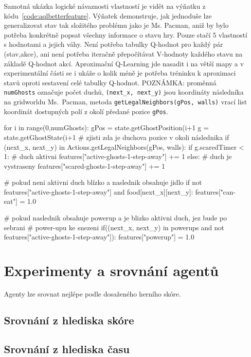 Samotná ukázka logické návaznosti vlastností je vidět na výňatku z kódu~\ref{code:aqlbetterfeature}. Výňatek demonstruje, jak jednoduše lze generalizovat stav tak složitého problému jako je Ms. Pacman, aniž by bylo potřeba konkrétně popsat všechny informace o stavu hry. Pouze stačí 5 vlastností s hodnotami a jejich váhy. Není potřeba tabulky Q-hodnot pro každý pár (stav,akce), ani není potřeba iteračně přepočítávat V-hodnoty každého stavu na základě Q-hodnot akcí. Aproximační Q-Learning jde nasadit i na větší mapy a v experimentální části se i ukáže o kolik méně je potřeba tréninku k aproximaci stavů oproti sestavení celé tabulky Q-hodnot. \newline POZNÁMKA: proměnná \texttt{numGhosts} označuje počet duchů, \texttt{(next\_x, next\_y)} jsou koordináty následníka na gridworldu Ms.~Pacman, metoda \texttt{getLegalNeighbors(gPos, walls)} vrací list koordinát dostupných polí z okolí předané pozice \texttt{gPos}.
\begin{python}[label={code:aqlbetterfeature}]
for i in range(0,numGhosts):
   gPos = state.getGhostPosition(i+1%
   g = state.getGhostState(i+1%
   # zjisti zda je duchova pozice v okoli následnika
   if (next_x, next_y) in Actions.getLegalNeighbors(gPos, walls):
      if g.scaredTimer < 1:   # duch aktivni
         features["active-ghosts-1-step-away"] += 1
      else:                   # duch je vystraseny
         features["scared-ghosts-1-step-away"] += 1

# pokud neni aktivni duch blízko a naslednik obsahuje jidlo
if not features["active-ghosts-1-step-away"] and food[next_x][next_y]:
   features["can-eat"] = 1.0

# pokud naslednik obsahuje powerup a je blizko aktivni duch, jez bude po sebrani
# power-upu ke snezeni
if((next_x, next_y) in powerups and not 
features["active-ghosts-1-step-away"]):
    features["powerup"] = 1.0
\end{python}

\chapter{Experimenty a srovnání agentů}
\label{exper}
Agenty lze srovnat nejlépe podle dosaženého herního skóre.
\section{Srovnání z hlediska skóre}
\section{Srovnání z hlediska času}
